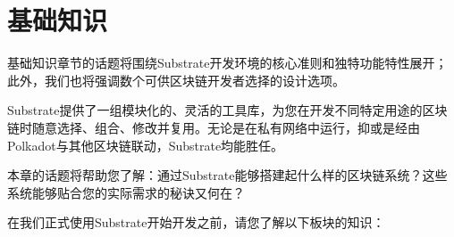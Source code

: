 \section{基础知识}

基础知识章节的话题将围绕Substrate开发环境的核心准则和独特功能特性展开；此外，我们也将强调数个可供区块链开发者选择的设计选项。

Substrate提供了一组模块化的、灵活的工具库，为您在开发不同特定用途的区块链时随意选择、组合、修改并复用。无论是在私有网络中运行，抑或是经由Polkadot与其他区块链联动，Substrate均能胜任。

本章的话题将帮助您了解：通过Substrate能够搭建起什么样的区块链系统？这些系统能够贴合您的实际需求的秘诀又何在？


在我们正式使用Substrate开始开发之前，请您了解以下板块的知识：

